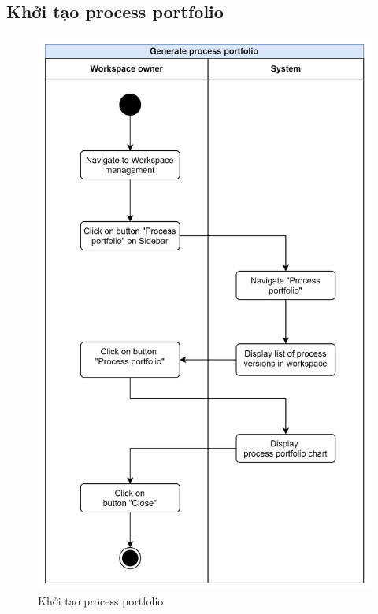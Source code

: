 \subsection{Khởi tạo process portfolio}
\begin{figure}[H]
    \centering
    \includegraphics[width=0.8\linewidth]{Content/Phân tích và thiết kế hệ thống/documents/Sơ đồ hoạt động/images/generateProcessPortfolio.png}
    \vspace{0.5cm}
    \caption{Khởi tạo process portfolio}
    \label{fig:Khởi tạo process portfolio}
\end{figure}